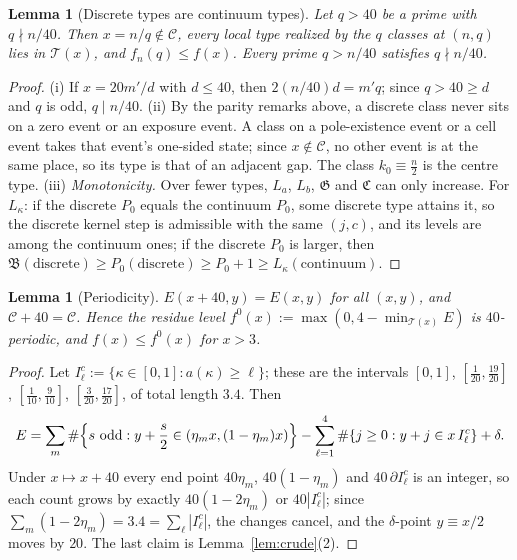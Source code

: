 \documentclass{amsart}
\newtheorem{lemma}[theorem]{Lemma}
\theoremstyle{definition}
\theoremstyle{remark}
\numberwithin{equation}{section}
\begin{document}
\begin{lemma}[Discrete types are continuum types]\label{lem:discrete}
Let $q>40$ be a prime with $q\nmid n/40$. Then $x=n/q\notin\mathcal C$, every
local type realized by the $q$ classes at $(n,q)$ lies in $\mathcal T(x)$, and
$f_n(q)\le f(x)$. Every prime $q>n/40$ satisfies $q\nmid n/40$.
\end{lemma}

\begin{proof}
(i) If $x=20m'/d$ with $d\le40$, then $2(n/40)d=m'q$; since $q>40\ge d$ and $q$
is odd, $q\mid n/40$.
(ii) By the parity remarks above, a discrete class never sits on a zero event
or an exposure event. A class on a pole-existence event or a cell event takes
that event's one-sided state; since $x\notin\mathcal C$, no other event is at
the same place, so its type is that of an adjacent gap. The class
$k_0\equiv\frac n2$ is the centre type.
(iii) \emph{Monotonicity.} Over fewer types, $L_a$, $L_b$, $\mathfrak G$ and
$\mathfrak C$ can only increase. For $L_\kappa$: if the discrete $P_0$ equals
the continuum $P_0$, some discrete type attains it, so the discrete kernel
step is admissible with the same $(j,c)$, and its levels are among the
continuum ones; if the discrete $P_0$ is larger, then
$\mathfrak B(\text{discrete})\ge P_0(\text{discrete})\ge P_0+1\ge L_\kappa(\text{continuum})$.
\end{proof}

\begin{lemma}[Periodicity]\label{lem:periodic}
$E(x+40,y)=E(x,y)$ for all $(x,y)$, and $\mathcal C+40=\mathcal C$. Hence the
residue level $f^0(x):=\max(0,4-\min_{\mathcal T(x)}E)$ is $40$-periodic, and
$f(x)\le f^0(x)$ for $x>3$.
\end{lemma}

\begin{proof}
Let $I_\ell^c:=\{\kappa\in[0,1]:a(\kappa)\ge\ell\}$; these are the intervals
$[0,1]$, $[\frac1{20},\frac{19}{20}]$, $[\frac1{10},\frac9{10}]$,
$[\frac3{20},\frac{17}{20}]$, of total length $3.4$. Then
\[
  E=\sum_m\#\Bigl\{s\text{ odd}:y+\frac s2\in(\eta_mx,(1-\eta_m)x)\Bigr\}
  -\sum_{\ell=1}^{4}\#\{j\ge0:y+j\in x\,I_\ell^c\}+\delta .
\]
Under $x\mapsto x+40$ every end point $40\eta_m$, $40(1-\eta_m)$ and
$40\,\partial I^c_\ell$ is an integer, so each count grows by exactly
$40(1-2\eta_m)$ or $40|I^c_\ell|$; since
$\sum_m(1-2\eta_m)=3.4=\sum_\ell|I^c_\ell|$, the changes cancel, and the
$\delta$-point $y\equiv x/2$ moves by $20$. The last claim is
Lemma~\ref{lem:crude}(2).
\end{proof}
\end{document}
